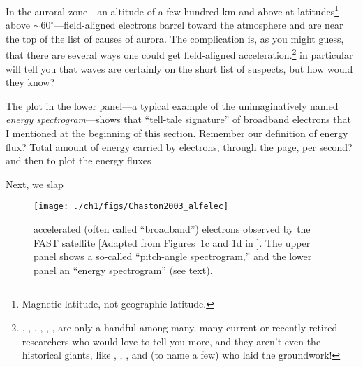 In the auroral zone---an altitude of a few hundred km and above at
latitudes\footnote{Magnetic latitude, not geographic latitude.} above
$\sim$60$^\circ$---field-aligned electrons barrel toward the
atmosphere and are near the top of the list of causes of aurora. The
complication is, as you might guess, that there are several ways one
could get field-aligned acceleration.\footnote{\citet{Wygant2002},
  \citet{Bostrom2003a}, \citet{Morooka2004}, \citet{Newell2009},
  \citet{Hull2010}, \citet{Mottez2016}, are only a handful among many,
  many current or recently retired researchers who would love to tell
  you more, and they aren't even the historical giants, like
  \citet{Knight1973}, \citet{Evans1974}, \citet{Hasegawa1976}, and
  \citet{Lyons1980a} (to name a few) who laid the groundwork!}
\citet{Chaston2002,Chaston2003a,Chaston2007,Chaston2008} in particular
will tell you that \Alf waves are certainly on the short list of
suspects, but how would they know?

The plot in the lower panel---a typical example of the unimaginatively
named \emph{energy spectrogram}---shows that ``tell-tale signature''
of broadband electrons that I mentioned at the beginning of this
section. Remember our definition of energy flux? Total amount of
energy carried by electrons, through the page, per second?  and
then to plot the energy fluxes

Next, we slap 


  \begin{figure}
    \centering
    \noindent\texttt{[image: ./ch1/figs/Chaston2003\_alfelec]}
    \caption[\Alfically accelerated (broadband) electrons]{\Alfically
      accelerated (often called ``broadband'') electrons observed by
      the FAST satellite [Adapted from Figures~1c and 1d in
      \citealp{Chaston2003a}]. The upper panel shows a so-called
      ``pitch-angle spectrogram,'' and the lower panel an ``energy
      spectrogram'' (see text).}
    \label{ch1:FigAlfElec}
  \end{figure}


  

\setlength\parindent{\savedparindent}
\setlength\parskip{\savedparskip}



